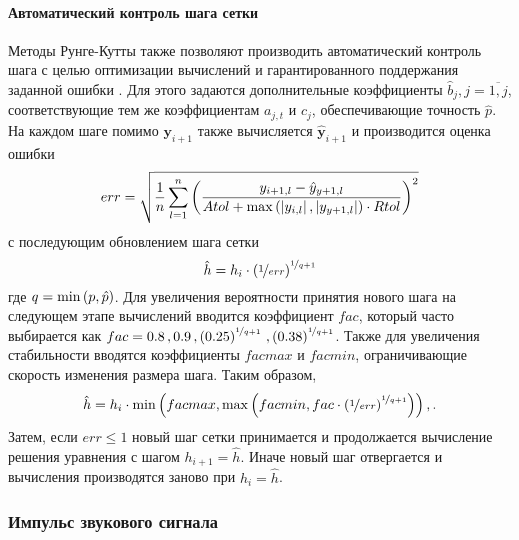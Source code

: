 \documentclass[../document.tex]{subfiles}
\begin{document}
            \paragraph{Автоматический контроль шага сетки}
                \par Методы Рунге-Кутты также позволяют производить автоматический контроль шага с целью оптимизации вычислений и гарантированного поддержания заданной ошибки \cite{dense}. Для этого задаются дополнительные коэффициенты $\hat{b}_j, j=\overline{1,j}$, соответствующие тем же коэффициентам $a_{j,t}$ и $c_j$, обеспечивающие точность $\hat{p}$. На каждом шаге помимо $\boldsymbol{y}_{i+1}$ также вычисляется $\boldsymbol{\hat{y}}_{i+1}$ и производится оценка ошибки
                \begin{equation}
                    err=\sqrt{\frac{1}{n}\sum\limits_{l=1}^n\left(\frac{y_{i+1,l}-\hat{y}_{y+1,l}}{Atol+\max\left(\left|y_{i,l}\right|, \left|y_{y+1,l}\right|\right)\cdot Rtol}\right)^2}
                \end{equation}
                с последующим обновлением шага сетки
                \begin{equation}
                    \hat{h}=h_i\cdot\left(\nicefrac{1}{err}\right)^{\nicefrac{1}{q+1}}
                \end{equation}
                где $q=\min\left(p,\hat{p}\right)$. Для увеличения вероятности принятия нового шага на следующем этапе вычислений вводится коэффициент $fac$, который часто выбирается как $fac=0.8\,,0.9\,,\left(0.25\right)^{\nicefrac{1}{q+1}}\,,\left(0.38\right)^{\nicefrac{1}{q+1}}$. Также для увеличения стабильности вводятся коэффициенты $facmax$ и $facmin$, ограничивающие скорость изменения размера шага. Таким образом,
                \begin{equation}
                    \hat{h}=h_i\cdot\min\left(facmax,\max\left(facmin,fac\cdot\left(\nicefrac{1}{err}\right)^{\nicefrac{1}{q+1}}\right)\right),.
                \end{equation}
                Затем, если $err\leqslant1$ новый шаг сетки принимается и продолжается вычисление решения уравнения с шагом $h_{i+1}=\hat{h}$. Иначе новый шаг отвергается и вычисления производятся заново при $h_i=\hat{h}$.
        \subsubsection{Импульс звукового сигнала}
\end{document}
